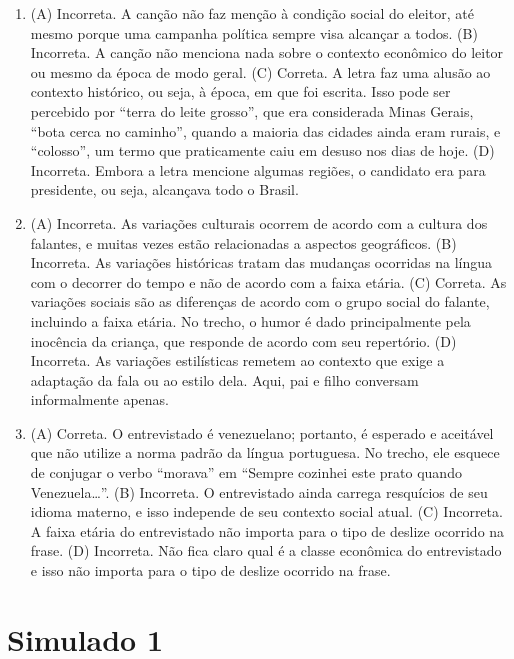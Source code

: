 \begin{enumerate}
\item (A) Incorreta. A canção não faz menção à condição social do eleitor, até
mesmo porque uma campanha política sempre visa alcançar a todos.
(B) Incorreta. A canção não menciona nada sobre o contexto econômico do
leitor ou mesmo da época de modo geral.
(C) Correta. A letra faz uma alusão ao contexto histórico, ou seja, à
época, em que foi escrita. Isso pode ser percebido por ``terra do leite
grosso'', que era considerada Minas Gerais, ``bota cerca no caminho'',
quando a maioria das cidades ainda eram rurais, e ``colosso'', um termo
que praticamente caiu em desuso nos dias de hoje.
(D) Incorreta. Embora a letra mencione algumas regiões, o candidato era
para presidente, ou seja, alcançava todo o Brasil.

\item (A) Incorreta. As variações culturais ocorrem de acordo com a cultura dos
falantes, e muitas vezes estão relacionadas a aspectos geográficos.
(B) Incorreta. As variações históricas tratam das mudanças ocorridas na
língua com o decorrer do tempo e não de acordo com a faixa etária.
(C) Correta. As variações sociais são as diferenças de acordo com o grupo
social do falante, incluindo a faixa etária. No trecho, o humor é dado
principalmente pela inocência da criança, que responde de acordo com seu
repertório.
(D) Incorreta. As variações estilísticas remetem ao contexto que exige a
adaptação da fala ou ao estilo dela. Aqui, pai e filho conversam
informalmente apenas.

\item (A) Correta. O entrevistado é venezuelano; portanto, é esperado e
aceitável que não utilize a norma padrão da língua portuguesa. No
trecho, ele esquece de conjugar o verbo ``morava'' em ``Sempre cozinhei
este prato quando Venezuela\ldots{}''.
(B) Incorreta. O entrevistado ainda carrega resquícios de seu idioma
materno, e isso independe de seu contexto social atual.
(C) Incorreta. A faixa etária do entrevistado não importa para o tipo de
deslize ocorrido na frase.
(D) Incorreta. Não fica claro qual é a classe econômica do entrevistado e
isso não importa para o tipo de deslize ocorrido na frase.
\end{enumerate}

\section*{Simulado 1}

